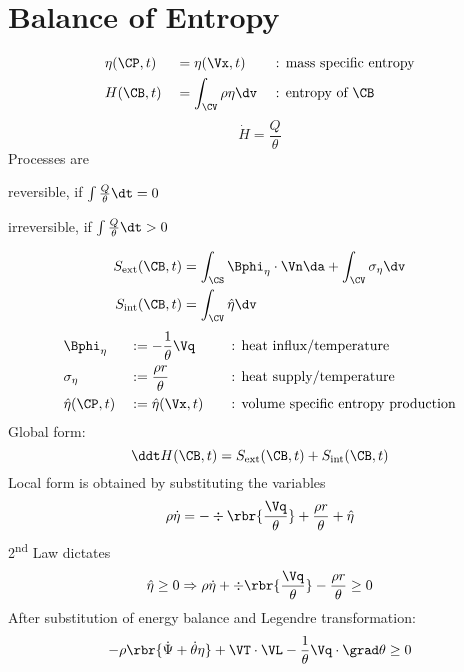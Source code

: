 \documentclass[a5paper,twosided,11pt,DIV=15,BCOR=0mm]{scrbook}
\newcommand{\ext}{\ensuremath{\textup{ext}}}
\newcommand{\inte}{\ensuremath{\textup{int}}}
\begin{document}
\section{Balance of Entropy}
\begin{alignat*}{3}
  & \eta(\CP,t) && = \eta(\Vx, t) && \textrm{: mass specific entropy}\\
  & H(\CB,t) && = \int_\CV\rho\eta\dv\,\, && \textrm{: entropy of }\CB
\end{alignat*}
%
\begin{equation}
  \dot{H} = \frac{Q}{\theta}
\end{equation}
Processes are
\begin{itemize*}
\item reversible, if $\int \frac{Q}{\theta} \dt = 0$
\item irreversible, if $\int \frac{Q}{\theta} \dt > 0$
\end{itemize*}
\begin{align}
  S_\ext(\CB,t) &= \int_\CS\Bphi_\eta\cdot\Vn\da + \int_\CV\sigma_\eta\dv \\
  S_\inte (\CB,t) &= \int_\CV\hat{\eta}\dv
\end{align}
\begin{alignat*}{3}
  & \Bphi_\eta && := -\frac{1}{\theta}\Vq && \textrm{: heat influx/temperature}\\
  & \sigma_\eta && := \frac{\rho r}{\theta} && \textrm{: heat supply/temperature}\\
  & \hat{\eta}(\CP,t) && := \hat{\eta}(\Vx,t)\quad && \textrm{: volume specific
    entropy production}
\end{alignat*}
%
Global form:
\begin{equation}
    \ddt H(\CB,t) = S_\ext(\CB,t) + S_\inte(\CB,t)
\end{equation}
Local form is obtained by substituting the variables
\begin{equation}
 \rho \dot{\eta} = -\div\rbr{\frac{\Vq}{\theta}} + \frac{\rho r}{\theta} + \hat{\eta}
\end{equation}
2\textsuperscript{nd} Law dictates
\begin{equation}
\hat{\eta} \geq 0  \Rightarrow  \rho \dot{\eta} +\div\rbr{\frac{\Vq}{\theta}} -
  \frac{\rho r}{\theta} \geq 0
\end{equation}
After substitution of energy balance and Legendre transformation:
\begin{equation}
-\rho\rbr{\dot{\Psi} + \dot{\theta}\eta} + \VT\cdot\VL -
  \frac{1}{\theta}\Vq\cdot\grad\theta \geq 0
\end{equation}
%
\end{document}

